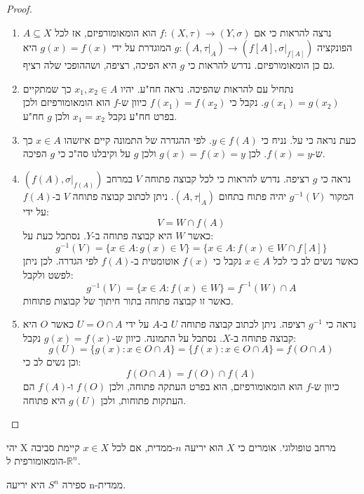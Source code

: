 \documentclass{tstextbook}
\begin{document}
\begin{proof}
  \begin{enumerate}
    \item נרצה להראות כי אם \(f:(X,\tau)\to(Y,\sigma)\) הוא הומאומורפיזם, אז לכל \(A\subseteq X\) הפונקציה \(g:(A,\tau|_{A})\to(f[A],\sigma|_{f[A]})\) המוגדרת על ידי \(g(x)=f(x)\) היא גם כן הומאומורפיזם. נדרש להראות כי \(g\) היא הפיכה, רציפה, ושההופכי שלה רציף. 


    \item נתחיל עם להראות שהפיכה. נראה חח"ע. יהיו \(x_{1},x_{2}\in A\) כך שמתקיים \(g(x_{1})=g(x_{2})\). נקבל כי \(f(x_{1})=f(x_{2})\) כיוון ש-\(f\) הוא הומאומורפיזם ולכן בפרט חח"ע נקבל \(x_{1}=x_{2}\) ולכן \(g\) חח"ע. 


    \item כעת נראה כי על. נניח כי \(y \in f(A)\). לפי ההגדרה של התמונה קיים איזשהו \(x \in A\) כך ש-\(f(x)=y\). לכן \(g(x)=f(x)=y\) ולכן \(g\) על וקיבלנו סה"כ כי \(g\) הפיכה. 


    \item נראה כי \(g\) רציפה. נדרש להראות כי לכל קבוצה פתוחה \(V\) במרחב \((f(A),\sigma|_{f(A)})\) המקור \(g^{-1}(V)\) יהיה פתוח בתחום \((A,\tau|_{A})\). ניתן לכתוב קבוצה פתוחה \(V\) ב-\(f(A)\) על ידי: 
$$V=W\cap f(A)$$
כאשר \(W\) היא קבוצה פתוחה ב-\(Y\).  נסתכל כעת על:
$$g^{-1}(V)=\{x\in A:g(x)\in V\}=\{x\in A:f(x)\in W\cap f[A]\}$$
כאשר נשים לב כי לכל \(x \in A\) נקבל כי \(f(x)\) אוטומטית ב-\(f(A)\) לפי הגדרה. לכן ניתן לפשט ולקבל:
$$g^{-1}(V)=\{x\in A:f(x)\in W\}=f^{-1}(W)\cap A$$
כאשר זו קבוצה פתוחה בתור חיתוך של קבוצות פתוחות.


    \item נראה כי \(g^{-1}\) רציפה. ניתן לכתוב קבוצה פתוחה \(U\) ב-\(A\) על ידי \(U=O\cap A\) כאשר \(O\) היא קבוצה פתוחה ב-\(X\). נסתכל על התמונה. כיוון ש-\(g(x)=f(x)\) נקבל: 
$$g(U)=\{g(x):x\in O\cap A\}=\{f(x):x\in O\cap A\}=f(O\cap A)$$
וכן נשים לב כי:
$$f(O\cap A)=f(O)\cap f(A)$$
כיוון ש-\(f\) הוא הומאומורפיזם, הוא בפרט העתקה פתוחה, ולכן \(f(O)\) ו-\(f(A)\) הם העתקות פתוחות, ולכן \(g(U)\) היא פתוחה.


  \end{enumerate}
\end{proof}
\begin{definition}
יהי X מרחב טופולוגי. אומרים כי \(X\) הוא יריעה \(n\)-ממדית, אם לכל \(x\in X\) קיימת סביבה הומאומורפית ל-\(\mathbb{R}^n\).

\end{definition}
\begin{example}
ספירה \(S^{n}\) היא יריעה n-ממדית.

\end{example}
\end{document}
